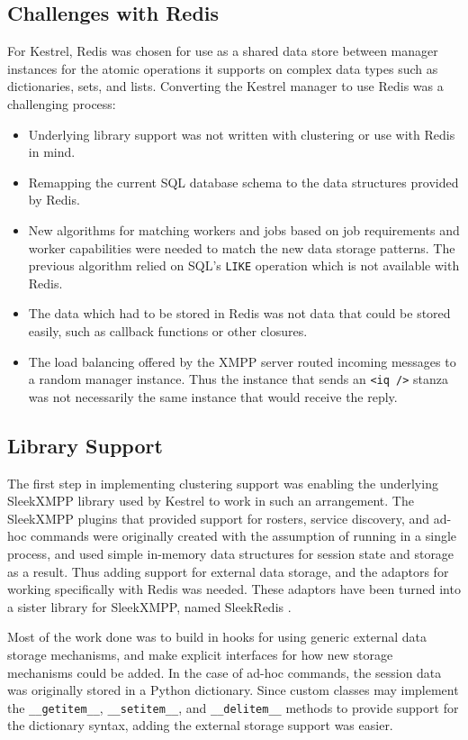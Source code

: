 \subsection{Challenges with Redis}
For Kestrel, Redis \cite{Redis} was chosen for use as a shared data store between
manager instances for the atomic operations it supports on complex data types such
as dictionaries, sets, and lists. Converting the Kestrel manager to use Redis was
a challenging process:
\begin{itemize}
\item Underlying library support was not written with clustering or use with Redis
in mind.
\item Remapping the current SQL database schema to the data structures provided by Redis.
\item New algorithms for matching workers and jobs based on job requirements and worker
capabilities were needed to match the new data storage patterns. The previous algorithm
relied on SQL's \texttt{LIKE} operation which is not available with Redis.
\item The data which had to be stored in Redis was not data that could be stored easily,
such as callback functions or other closures.
\item The load balancing offered by the XMPP server routed incoming messages to a random
manager instance. Thus the instance that sends an \texttt{<iq />} stanza was not
necessarily the same instance that would receive the reply.
\end{itemize}

\subsection{Library Support}
The first step in implementing clustering support was enabling the underlying
SleekXMPP library used by Kestrel to work in such an arrangement. The SleekXMPP
plugins that provided support for rosters, service discovery, and ad-hoc commands
were originally created with the assumption of running in a single process,
and used simple in-memory data structures for session state and storage as a
result. Thus adding support for external data storage, and the adaptors for
working specifically with Redis was needed. These adaptors have been turned into
a sister library for SleekXMPP, named SleekRedis \cite{SleekRedis}.

Most of the work done was to build in hooks for using generic external
data storage mechanisms, and make explicit interfaces for how new storage
mechanisms could be added. In the case of ad-hoc commands, the session data was
originally stored in a Python dictionary. Since custom classes may implement the
\texttt{\_\_getitem\_\_}, \texttt{\_\_setitem\_\_}, and \texttt{\_\_delitem\_\_}
methods to provide support for the dictionary syntax, adding the external
storage support was easier.

